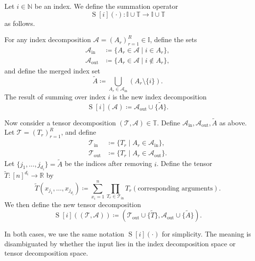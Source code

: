 \documentclass[letterpaper,11pt]{article}
\newcommand{\mytensorspace}{\mathbb{T}}
\newcommand{\myindexspace}{\mathbb{I}}
\newcommand{\sumonverindex}[2]{\operatorname{S}[#1](#2)}
\begin{document}
\begin{definition}\label{def:summing_operator}
Let $i \in \mathbb{N}$ be an index. We define the summation operator
\begin{equation}
\sumonverindex{i}{\cdot} : \myindexspace \cup \mytensorspace \to \myindexspace \cup \mytensorspace
\end{equation}
as follows.

For any index decomposition $\mathcal{A} = (A_r)_{r=1}^R \in \myindexspace$, define the sets
\begin{align}
\mathcal{A}_{\mathrm{in}} &\coloneqq \{ A_r \in \mathcal{A} \mid i \in A_r \}, \\
\mathcal{A}_{\mathrm{out}} &\coloneqq \{ A_r \in \mathcal{A} \mid i \notin A_r \},
\end{align}
and define the merged index set
\begin{equation}
\widetilde{A} \coloneqq \bigcup_{A_r \in \mathcal{A}_{\mathrm{in}}} (A_r \setminus \{i\}).
\end{equation}
The result of summing over index $i$ is the new index decomposition
\begin{equation}
\sumonverindex{i}{\mathcal{A}} \coloneqq \mathcal{A}_{\mathrm{out}} \cup \{ \widetilde{A} \}.
\end{equation}

Now consider a tensor decomposition $(\mathcal{T}, \mathcal{A}) \in \mytensorspace$. Define $\mathcal{A}_{\mathrm{in}}, \mathcal{A}_{\mathrm{out}}, \widetilde{A}$ as above. Let $\mathcal{T} = (T_r)_{r=1}^R$, and define
\begin{align}
\mathcal{T}_{\mathrm{in}} &\coloneqq \{ T_r \mid A_r \in \mathcal{A}_{\mathrm{in}} \}, \\
\mathcal{T}_{\mathrm{out}} &\coloneqq \{ T_r \mid A_r \in \mathcal{A}_{\mathrm{out}} \}.
\end{align}
Let $\{j_1, \dots, j_{d_i}\} = \widetilde{A}$ be the indices after removing $i$. Define the tensor $\widetilde{T} : [n]^{d_i} \to \mathbb{R}$ by
\begin{equation}
\widetilde{T}(x_{j_1}, \dots, x_{j_{d_i}}) \coloneqq \sum_{x_i = 1}^n \prod_{T_r \in \mathcal{T}_{\mathrm{in}}} T_r(\text{corresponding arguments}).
\end{equation}
We then define the new tensor decomposition
\begin{equation}
\sumonverindex{i}{(\mathcal{T}, \mathcal{A})} \coloneqq \left( \mathcal{T}_{\mathrm{out}} \cup \{ \widetilde{T} \}, \mathcal{A}_{\mathrm{out}} \cup \{ \widetilde{A} \} \right).
\end{equation}

In both cases, we use the same notation $\sumonverindex{i}{\cdot}$ for simplicity. The meaning is disambiguated by whether the input lies in the index decomposition space or tensor decomposition space.
\end{definition}
\end{document}
